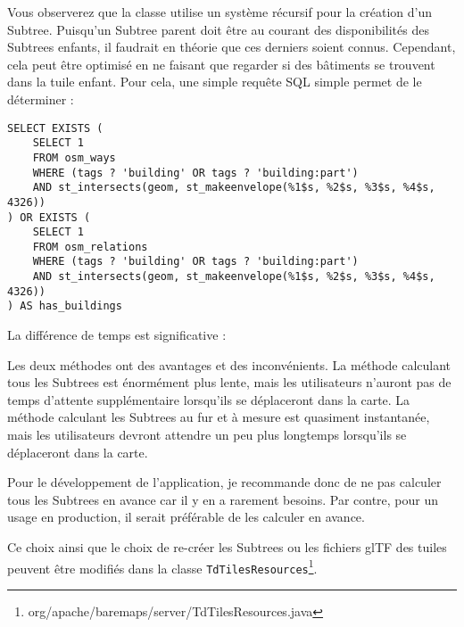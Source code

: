 Vous observerez que la classe utilise un système récursif pour la création d'un Subtree. Puisqu'un Subtree parent doit être au courant des disponibilités des Subtrees enfants, il faudrait en théorie que ces derniers soient connus. Cependant, cela peut être optimisé en ne faisant que regarder si des bâtiments se trouvent dans la tuile enfant. Pour cela, une simple requête SQL simple permet de le déterminer :

\begin{verbatim}
SELECT EXISTS (
    SELECT 1
    FROM osm_ways
    WHERE (tags ? 'building' OR tags ? 'building:part')
    AND st_intersects(geom, st_makeenvelope(%1$s, %2$s, %3$s, %4$s, 4326))
) OR EXISTS (
    SELECT 1
    FROM osm_relations
    WHERE (tags ? 'building' OR tags ? 'building:part')
    AND st_intersects(geom, st_makeenvelope(%1$s, %2$s, %3$s, %4$s, 4326))
) AS has_buildings
\end{verbatim}

La différence de temps est significative :

\begin{listing}[h]
    
\end{listing}

Les deux méthodes ont des avantages et des inconvénients. La méthode calculant tous les Subtrees est énormément plus lente, mais les utilisateurs n'auront pas de temps d'attente supplémentaire lorsqu'ils se déplaceront dans la carte. La méthode calculant les Subtrees au fur et à mesure est quasiment instantanée, mais les utilisateurs devront attendre un peu plus longtemps lorsqu'ils se déplaceront dans la carte. 

Pour le développement de l'application, je recommande donc de ne pas calculer tous les Subtrees en avance car il y en a rarement besoins. Par contre, pour un usage en production, il serait préférable de les calculer en avance.

Ce choix ainsi que le choix de re-créer les Subtrees ou les fichiers glTF des tuiles peuvent être modifiés dans la classe \texttt{TdTilesResources}\footnote{org/apache/baremaps/server/TdTilesResources.java}.